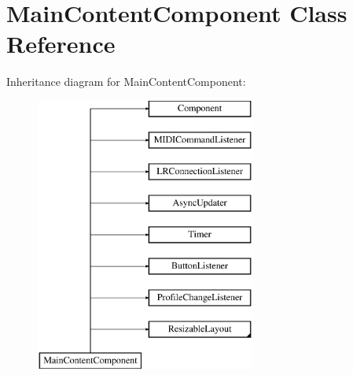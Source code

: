 \hypertarget{class_main_content_component}{}\section{Main\+Content\+Component Class Reference}
\label{class_main_content_component}
Inheritance diagram for Main\+Content\+Component\+:\begin{figure}[H]
\begin{center}
\leavevmode
\includegraphics[height=9.000000cm]{class_main_content_component}
\end{center}
\end{figure}
